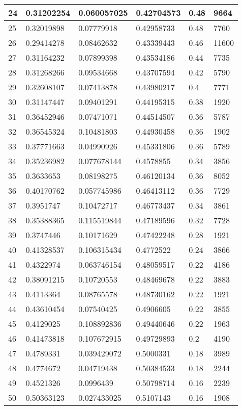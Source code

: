 \begin{longtable}{|l|l|l|l|l|l|}
24 & 0.31202254 & 0.060057025 & 0.42704573 & 0.48 & 9664 \\ \hline 
25 & 0.32019898 & 0.07779918 & 0.42958733 & 0.48 & 7760 \\ \hline 
26 & 0.29414278 & 0.08462632 & 0.43339443 & 0.46 & 11600 \\ \hline 
27 & 0.31164232 & 0.07899398 & 0.43534186 & 0.44 & 7735 \\ \hline 
28 & 0.31268266 & 0.09534668 & 0.43707594 & 0.42 & 5790 \\ \hline 
29 & 0.32608107 & 0.07413878 & 0.43980217 & 0.4 & 7771 \\ \hline 
30 & 0.31147447 & 0.09401291 & 0.44195315 & 0.38 & 1920 \\ \hline 
31 & 0.36452946 & 0.07471071 & 0.44514507 & 0.36 & 5787 \\ \hline 
32 & 0.36545324 & 0.10481803 & 0.44930458 & 0.36 & 1902 \\ \hline 
33 & 0.37771663 & 0.04990926 & 0.45331806 & 0.36 & 5789 \\ \hline 
34 & 0.35236982 & 0.077678144 & 0.4578855 & 0.34 & 3856 \\ \hline 
35 & 0.3633653 & 0.08198275 & 0.46120134 & 0.36 & 8052 \\ \hline 
36 & 0.40170762 & 0.057745986 & 0.46413112 & 0.36 & 7729 \\ \hline 
37 & 0.3951747 & 0.10472717 & 0.46773437 & 0.34 & 3861 \\ \hline 
38 & 0.35388365 & 0.115519844 & 0.47189596 & 0.32 & 7728 \\ \hline 
39 & 0.3747446 & 0.10171629 & 0.47422248 & 0.28 & 1921 \\ \hline 
40 & 0.41328537 & 0.106315434 & 0.4772522 & 0.24 & 3866 \\ \hline 
41 & 0.4322974 & 0.063746154 & 0.48059517 & 0.22 & 4186 \\ \hline 
42 & 0.38091215 & 0.10720553 & 0.48469678 & 0.22 & 3883 \\ \hline 
43 & 0.4113364 & 0.08765578 & 0.48730162 & 0.22 & 1921 \\ \hline 
44 & 0.43610454 & 0.07540425 & 0.4906605 & 0.22 & 3855 \\ \hline 
45 & 0.4129025 & 0.108892836 & 0.49440646 & 0.22 & 1963 \\ \hline 
46 & 0.41473818 & 0.107672915 & 0.49729893 & 0.2 & 4190 \\ \hline 
47 & 0.4789331 & 0.039429072 & 0.5000331 & 0.18 & 3989 \\ \hline 
48 & 0.4774672 & 0.04719438 & 0.50384533 & 0.18 & 2244 \\ \hline 
49 & 0.4521326 & 0.0996439 & 0.50798714 & 0.16 & 2239 \\ \hline 
50 & 0.50363123 & 0.027433025 & 0.5107143 & 0.16 & 1908 \\ \hline 
\end{longtable}